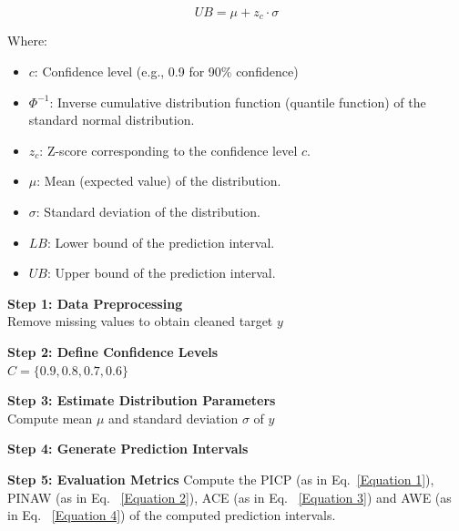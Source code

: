 \begin{itemize}
    \begin{equation}
        UB = \mu + z_c \cdot \sigma
        \label{up_bound}
    \end{equation}

    Where:
    \begin{itemize}
        \item $c$: Confidence level (e.g., 0.9 for 90\% confidence)
        \item $\Phi^{-1}$: Inverse cumulative distribution function (quantile function) of the standard normal distribution.
        \item $z_c$: Z-score corresponding to the confidence level $c$.
        \item $\mu$: Mean (expected value) of the distribution.
        \item $\sigma$: Standard deviation of the distribution.
        \item $LB$: Lower bound of the prediction interval.
        \item $UB$: Upper bound of the prediction interval.
    \end{itemize}


        \begin{algorithm}[H]
        \footnotesize
        \SetAlgoCaptionSeparator{:}
    
    
        \textbf{Step 1: Data Preprocessing}\\
        Remove missing values to obtain cleaned target $y$
    
        \textbf{Step 2: Define Confidence Levels}\\
        $C = \{0.9, 0.8, 0.7, 0.6\}$
    
        \textbf{Step 3: Estimate Distribution Parameters}\\
        Compute mean $\mu$ and standard deviation $\sigma$ of $y$
    
        \textbf{Step 4: Generate Prediction Intervals}\\
    
        \textbf{Step 5: Evaluation Metrics} Compute the PICP (as in Eq.~\eqref{Equation 1}), PINAW (as in Eq. ~\eqref{Equation 2}), ACE (as in Eq. ~\eqref{Equation 3}) and AWE (as in Eq. ~\eqref{Equation 4}) of the computed prediction intervals.
    

\end{algorithm}
\end{itemize}
